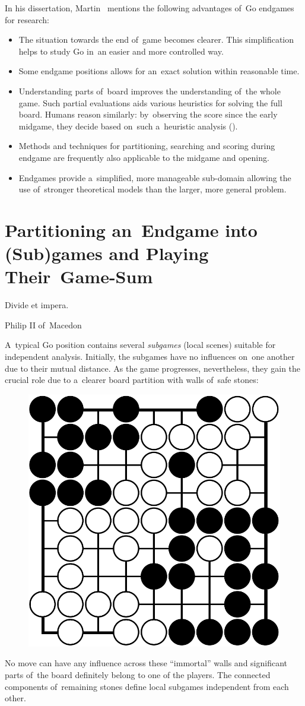 In his dissertation, Martin~\Mueller{} mentions the following advantages of~Go endgames for research:
\begin{itemize}
  \item The situation towards the end of~game becomes clearer.
    This simplification helps to study Go in~an easier and more controlled way.
  \item Some endgame positions allows for an~exact solution within reasonable time.
  \item Understanding parts of~board improves the understanding of~the whole game.
    Such partial evaluations aids various heuristics for solving the full board.
    Humans reason similarly: by~observing the score since the early midgame, they decide based on~such a~heuristic analysis (\cite{Takagawa85}).
  \item Methods and techniques for partitioning, searching and scoring during endgame are frequently also applicable to the midgame and opening.
  \item Endgames provide a~simplified, more manageable sub-domain allowing the use of~stronger theoretical models than the larger, more general problem.
\end{itemize}

\section{Partitioning an~Endgame into (Sub)games and Playing Their~Game-Sum}
{
  \setlength{\epigraphwidth}{0.4\textwidth}
  \epigraph{
    Divide et impera.
  }{Philip II of~Macedon}
}

A~typical Go position contains several \emph{subgames} (local scenes) suitable for independent analysis.
Initially, the subgames have no influences on~one another due to their mutual distance.
As the game progresses, nevertheless, they gain the crucial role due to a~clearer board partition with walls of~safe stones:
\begin{figure}[H]
  \centering
  \includegraphics[width=.4\textwidth]{../img/late_endgame_Go_position_suited_for_exact_analysis.png}
  \label{fig:immortal-wall}
\end{figure}
No move can have any influence across these ``immortal'' walls and significant parts of~the board definitely belong to one of the players.
The connected components of~remaining stones define local subgames independent from each other.

